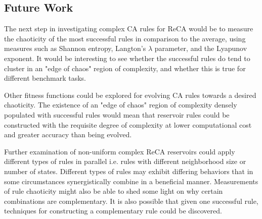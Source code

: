 \documentclass{elsarticle}
\begin{document}
\begin{multicols}{2}
\section{Future Work}\label{future_work}
The next step in investigating complex CA rules for ReCA would be to measure 
the chaoticity of the most successful rules in comparison to the average, using 
measures such as Shannon entropy, Langton's $\lambda$ parameter, and the 
Lyapunov exponent. It would be interesting to see whether the successful rules 
do tend to cluster in an "edge of chaos" region of complexity, and whether this
is true for different benchmark tasks. \par Other fitness functions could be 
explored for evolving CA rules towards a desired chaoticity. The existence of 
an "edge of chaos" region of complexity densely populated with successful rules 
would mean that reservoir rules could be constructed with the requisite degree 
of complexity at lower computational cost and greater accuracy than being 
evolved.  \par Further examination of non-uniform complex ReCA reservoirs could 
apply different types of rules in parallel i.e.  rules with different 
neighborhood size or number of states.  Different types of rules may exhibit 
differing behaviors that in some circumstances synergistically combine in a 
beneficial manner.  Measurements of rule chaoticity might also be able to shed 
some light on why certain combinations are complementary. It is also possible 
that given one successful rule, techniques for constructing a complementary 
rule could be discovered.

\fi



\end{multicols}
\end{document}
